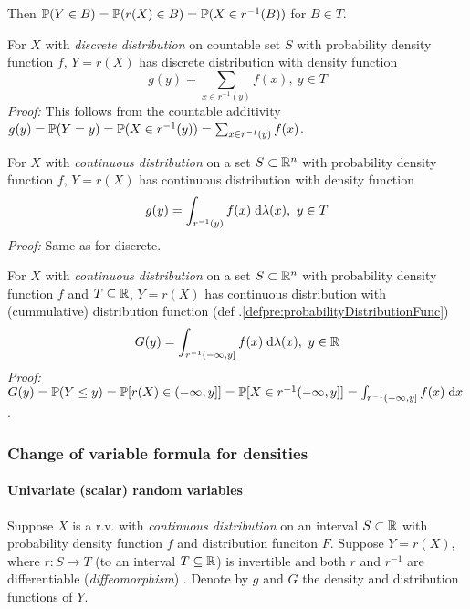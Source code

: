 Then $\mathbb{P}(Y \in B) = \mathbb{P}(r(X) \in B) = \mathbb{P}(X \in r^{-1}(B))$ for $B \in T$.

For $X$ with \emph{discrete distribution} on countable set $S$ with probability density function $f$, $Y = r(X)$ has discrete distribution with density function
\begin{equation}
g(y) = \sum_{x \in r^{-1}(y)} f(x), \ y \in T
\end{equation}
\emph{Proof:} This follows from the countable additivity $g(y) = \mathbb{P}(Y = y) = \mathbb{P}(X \in r^{-1}(y)) = \sum_{x \in r^{-1}(y)} f(x)$.


For $X$ with \emph{continuous distribution} on a set $S \subset \mathbb{R}^n$ with probability density function $f$, $Y = r(X)$ has continuous distribution with density function
\begin{equation}
g(y) = \int_{r^{-1}(y)} f(x) \; \text{d} \lambda(x), \ y \in T
\end{equation}
\emph{Proof:} Same as for discrete.

For $X$ with \emph{continuous distribution} on a set $S \subset \mathbb{R}^n$ with probability density function $f$ and $T \subseteq \mathbb{R}$, $Y = r(X)$ has continuous distribution with (cummulative) distribution function (def .\ref{defpre:probabilityDistributionFunc})
\begin{equation}
G(y) = \int_{r^{-1}(-\infty,y]} f(x) \; \text{d} \lambda(x), \ y \in \mathbb{R}
\end{equation}
\emph{Proof:} $G(y) = \mathbb{P}(Y \leq y) = \mathbb{P}[r(X) \in (-\infty,y]] = \mathbb{P}[X \in r^{-1}(-\infty,y]] = \int_{r^{-1}(-\infty,y]} f(x) \; \text{d} x$.

\subsubsection{Change of variable formula for densities}\label{secpre:changeOfVarDensity}

\paragraph{Univariate (scalar) random variables}

Suppose $X$ is a r.v. with \emph{continuous distribution} on an interval $S \subset \mathbb{R}$ with probability density function $f$ and distribution funciton $F$. Suppose $Y = r(X)$, where $r : S \to T$ (to an interval $T \subseteq \mathbb{R}$) is invertible and both $r$ and $r^{-1}$ are differentiable (\emph{diffeomorphism}) . Denote by $g$ and $G$ the density and distribution functions of $Y$.


